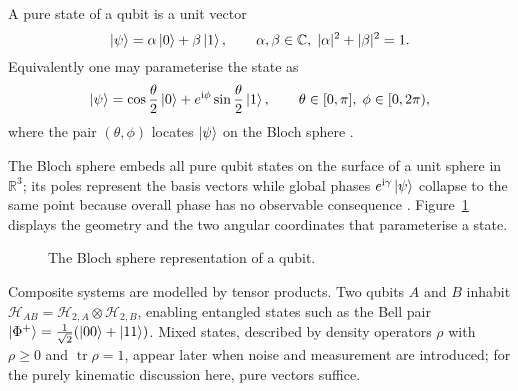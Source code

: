 \begin{definition}\label{def:pure-qubit}
A pure state of a qubit is a unit vector
\[
 \ket{\psi}= \alpha\ket{0}+\beta\ket{1},
 \qquad
 \alpha,\beta\in\mathbb C,\;
 |\alpha|^{2}+|\beta|^{2}=1.
\]
Equivalently one may parameterise the state as
\[
 \ket{\psi}=\cos\frac{\theta}{2}\ket{0}
       +e^{\mathrm i\phi}\sin\frac{\theta}{2}\ket{1},
 \qquad
 \theta\in[0,\pi],\;\phi\in[0,2\pi),
\]
where the pair \((\theta,\phi)\) locates \(\ket{\psi}\) on the Bloch
sphere \cite{NielsenChuang2010}.
\end{definition}

The Bloch sphere embeds all pure qubit states on the surface of a unit
sphere in \(\mathbb R^{3}\); its poles represent the basis vectors while
global phases \(e^{\mathrm i\gamma}\ket{\psi}\) collapse to the same
point because overall phase has no observable consequence
\cite{Sakurai1994}. Figure~\ref{fig:bloch_sphere} displays the geometry
and the two angular coordinates that parameterise a state.

\begin{figure}[ht]
 \centering
 \caption{The Bloch sphere representation of a qubit.}
 \label{fig:bloch_sphere}
 \end{figure}

 Composite systems are modelled by tensor products. Two qubits \(A\) and
 \(B\) inhabit
 \(\mathcal H_{AB}=\mathcal H_{2,A}\otimes\mathcal H_{2,B}\), enabling
 entangled states such as the Bell pair
 \(\ket{\Phi^{+}}=\tfrac{1}{\sqrt2}(\ket{00}+\ket{11})\). Mixed states,
 described by density operators \(\rho\) with
 \(\rho\ge0\) and \(\operatorname{tr}\rho=1\), appear later when noise
 and measurement are introduced; for the purely kinematic discussion
 here, pure vectors suffice.
 
